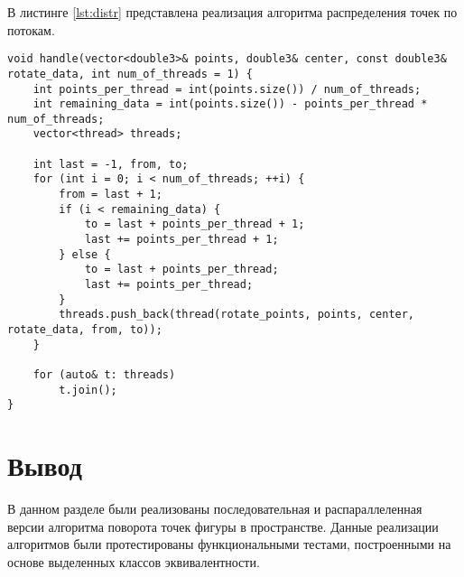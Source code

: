 В листинге \ref{lst:distr} представлена реализация алгоритма распределения точек по потокам.
\begin{lstlisting}[label=lst:distr,caption={Реализация алгоритма поворота точек}]
void handle(vector<double3>& points, double3& center, const double3& rotate_data, int num_of_threads = 1) {
    int points_per_thread = int(points.size()) / num_of_threads;
    int remaining_data = int(points.size()) - points_per_thread * num_of_threads;
    vector<thread> threads;

    int last = -1, from, to;
    for (int i = 0; i < num_of_threads; ++i) {
        from = last + 1;
        if (i < remaining_data) {
            to = last + points_per_thread + 1;
            last += points_per_thread + 1;
        } else {
            to = last + points_per_thread;
            last += points_per_thread;
        }
        threads.push_back(thread(rotate_points, points, center, rotate_data, from, to));
    }

    for (auto& t: threads)
        t.join();
}
\end{lstlisting}

\section{Вывод}

В данном разделе были реализованы последовательная и распа­раллеленная версии 
алгоритма поворота точек фигуры в пространстве. Данные реализации алгоритмов были
протестированы функциональными тестами, построенными на основе выделенных классов 
эквивалентности.
